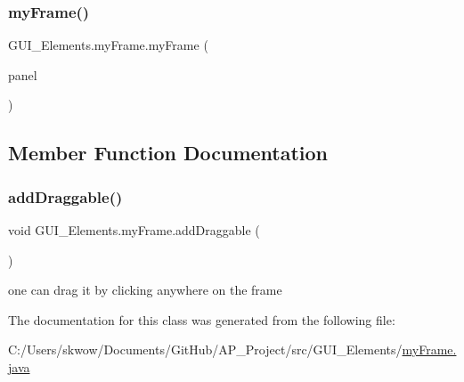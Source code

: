 \subsubsection{\texorpdfstring{my\+Frame()}{myFrame()}}
{\footnotesize\ttfamily G\+U\+I\+\_\+\+Elements.\+my\+Frame.\+my\+Frame (\begin{DoxyParamCaption}\item[{\hyperlink{class_g_u_i___elements_1_1my_panel}{my\+Panel}}]{panel }\end{DoxyParamCaption})}



\subsection{Member Function Documentation}
\hypertarget{class_g_u_i___elements_1_1my_frame_a5f5da5b4e114c7aff38f3b4b361bf483}{}\label{class_g_u_i___elements_1_1my_frame_a5f5da5b4e114c7aff38f3b4b361bf483} 
\subsubsection{\texorpdfstring{add\+Draggable()}{addDraggable()}}
{\footnotesize\ttfamily void G\+U\+I\+\_\+\+Elements.\+my\+Frame.\+add\+Draggable (\begin{DoxyParamCaption}{ }\end{DoxyParamCaption})}



one can drag it by clicking anywhere on the frame 



The documentation for this class was generated from the following file\+:\begin{DoxyCompactItemize}
\item 
C\+:/\+Users/skwow/\+Documents/\+Git\+Hub/\+A\+P\+\_\+\+Project/src/\+G\+U\+I\+\_\+\+Elements/\hyperlink{my_frame_8java}{my\+Frame.\+java}\end{DoxyCompactItemize}
